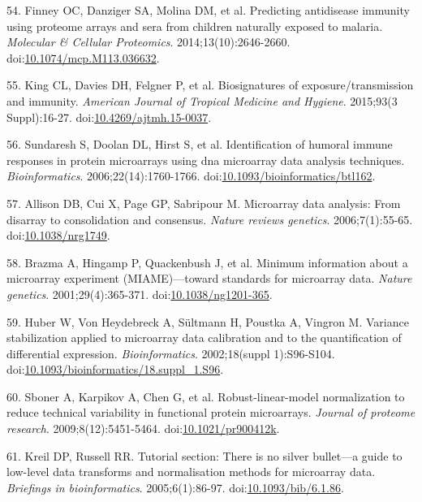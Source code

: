 \documentclass[]{article}
\begin{document}
\hypertarget{ref-Finney2014}{}
54. Finney OC, Danziger SA, Molina DM, et al. Predicting antidisease
immunity using proteome arrays and sera from children naturally exposed
to malaria. \emph{Molecular \& Cellular Proteomics}.
2014;13(10):2646-2660.
doi:\href{https://doi.org/10.1074/mcp.M113.036632}{10.1074/mcp.M113.036632}.

\hypertarget{ref-King2015FOC}{}
55. King CL, Davies DH, Felgner P, et al. Biosignatures of
exposure/transmission and immunity. \emph{American Journal of Tropical
Medicine and Hygiene}. 2015;93(3 Suppl):16-27.
doi:\href{https://doi.org/10.4269/ajtmh.15-0037}{10.4269/ajtmh.15-0037}.

\hypertarget{ref-sundaresh2006}{}
56. Sundaresh S, Doolan DL, Hirst S, et al. Identification of humoral
immune responses in protein microarrays using dna microarray data
analysis techniques. \emph{Bioinformatics}. 2006;22(14):1760-1766.
doi:\href{https://doi.org/10.1093/bioinformatics/btl162}{10.1093/bioinformatics/btl162}.

\hypertarget{ref-allison2006}{}
57. Allison DB, Cui X, Page GP, Sabripour M. Microarray data analysis:
From disarray to consolidation and consensus. \emph{Nature reviews
genetics}. 2006;7(1):55-65.
doi:\href{https://doi.org/10.1038/nrg1749}{10.1038/nrg1749}.

\hypertarget{ref-brazma2001}{}
58. Brazma A, Hingamp P, Quackenbush J, et al. Minimum information about
a microarray experiment (MIAME)---toward standards for microarray data.
\emph{Nature genetics}. 2001;29(4):365-371.
doi:\href{https://doi.org/10.1038/ng1201-365}{10.1038/ng1201-365}.

\hypertarget{ref-huber2002vsn}{}
59. Huber W, Von Heydebreck A, Sültmann H, Poustka A, Vingron M.
Variance stabilization applied to microarray data calibration and to the
quantification of differential expression. \emph{Bioinformatics}.
2002;18(suppl 1):S96-S104.
doi:\href{https://doi.org/10.1093/bioinformatics/18.suppl_1.S96}{10.1093/bioinformatics/18.suppl\_1.S96}.

\hypertarget{ref-sboner2009rlm}{}
60. Sboner A, Karpikov A, Chen G, et al. Robust-linear-model
normalization to reduce technical variability in functional protein
microarrays. \emph{Journal of proteome research}. 2009;8(12):5451-5464.
doi:\href{https://doi.org/10.1021/pr900412k}{10.1021/pr900412k}.

\hypertarget{ref-kreil2005bullet}{}
61. Kreil DP, Russell RR. Tutorial section: There is no silver
bullet---a guide to low-level data transforms and normalisation methods
for microarray data. \emph{Briefings in bioinformatics}.
2005;6(1):86-97.
doi:\href{https://doi.org/10.1093/bib/6.1.86}{10.1093/bib/6.1.86}.
\end{document}
